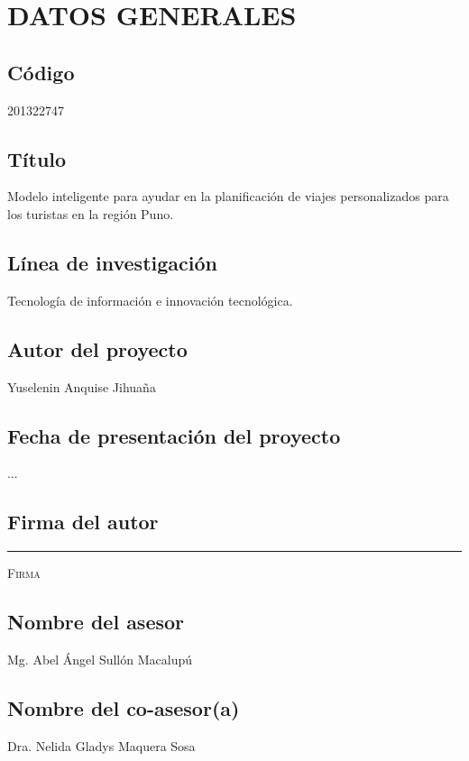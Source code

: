 \chapter{DATOS GENERALES}
\section{Código}
201322747
\section{Título}
Modelo inteligente para ayudar en la planificación de viajes personalizados para los turistas en la región Puno.
\section{Línea de investigación}
Tecnología de información e innovación tecnológica.
\section{Autor del proyecto}
Yuselenin Anquise Jihuaña
\section{Fecha de presentación del proyecto}
...
\section{Firma del autor}
{
\vspace{8em}
\centering
\rule[0em]{20em}{0.5pt}%
\begin{center}
    \textsc{Firma}
\end{center}
}

\section{Nombre del asesor}
Mg. Abel Ángel Sullón Macalupú
\section{Nombre del co-asesor(a)}
Dra. Nelida Gladys Maquera Sosa
